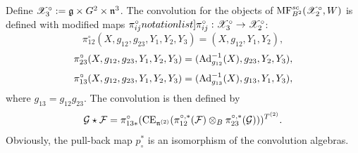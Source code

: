 
Define $\mathscr{X}_3^\circ:=\mathfrak{g}\times G^2\times \mathfrak{n}^3$.
The convolution for the objects of $\mathrm{MF}^{sc}_{B^{2}}(\mathscr{X}^\circ_2,W)$ is defined with modified maps $\SymbolPrint{\pi_{ij}^\circ}:\calX_3^\circ\to\calX_2^\circ$:
$$\pi^\circ_{12}(X,g_{12},g_{23},Y_1,Y_2,Y_3)=(X,g_{12},Y_1,Y_2),$$
$$\pi^\circ_{23}(X,g_{12},g_{23},Y_1,Y_2,Y_3)=({\rm Ad}_{g_{12}}^{-1}(X),g_{23},Y_2,Y_3),$$
$$\pi^\circ_{13}(X,g_{12},g_{23},Y_1,Y_2,Y_3)=({\rm Ad}_{g_{13}}^{-1}(X),g_{13},Y_1,Y_3),$$
 where $g_{13}=g_{12} g_{23}$.
 The convolution is then defined by
 $$ \mathcal{G}\star \mathcal{F}=\pi^\circ_{13*}(\mathrm{CE}_{\mathfrak{n}^{(2)}}( \pi^{\circ,*}_{12}(\mathcal{F})\otimes_B\pi^{\circ,*}_{23}(\mathcal{G})))^{T^{(2)}}.$$
Obviously, the pull-back map $p_\circ^*$ is an isomorphism of the convolution algebras.




